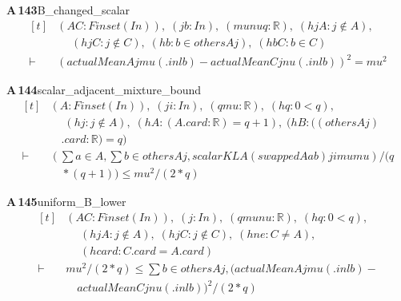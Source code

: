 \documentclass[conference]{IEEEtran}
\theoremstyle{definition}
\newcommand{\lean}[1]{\textsf{\footnotesize #1}}
\begin{document}
\noindent\textbf{A\,143}\quad\lean{B\_changed\_scalar}
{\footnotesize\[ \begin{aligned}[t]
&(\mathit{A} \mathit{C} : \mathit{Finset} (\mathit{I} \mathit{n})),\; (\mathit{j} \mathit{b} : \mathit{I} \mathit{n}),\; (\mathit{mu} \mathit{nu} \mathit{q} : \mathbb{R} ),\; (\mathit{hjA} : \mathit{j} \notin \mathit{A}),\\
&\quad \; (\mathit{hjC} : \mathit{j} \notin \mathit{C}),\; (\mathit{hb} : \mathit{b} \in \mathit{others} \mathit{A} \mathit{j}),\; (\mathit{hbC} : \mathit{b} \in \mathit{C})\\
\vdash\;&(\mathit{actualMean} \mathit{A} \mathit{j} \mathit{mu} (.\mathit{inl} \mathit{b})-\mathit{actualMean} \mathit{C} \mathit{j} \mathit{nu} (.\mathit{inl} \mathit{b}))^{2}=\mathit{mu}^{2}
\end{aligned} \]}

\noindent\textbf{A\,144}\quad\lean{scalar\_adjacent\_mixture\_bound}
{\footnotesize\[ \begin{aligned}[t]
&(\mathit{A} : \mathit{Finset} (\mathit{I} \mathit{n})),\; (\mathit{j} \mathit{i} : \mathit{I} \mathit{n}),\; (\mathit{q} \mathit{mu} : \mathbb{R} ),\; (\mathit{hq} : 0<\mathit{q}),\\
&\quad \; (\mathit{hj} : \mathit{j} \notin \mathit{A}),\; (\mathit{hA} : (\mathit{A}.\mathit{card}:\mathbb{R} )=\mathit{q}+1),\; (\mathit{hB} : ((\mathit{others} \mathit{A} \mathit{j})\\
&\quad .\mathit{card}:\mathbb{R} )=\mathit{q})\\
\vdash\;&(\textstyle\sum \mathit{a} \in \mathit{A},\textstyle\sum \mathit{b} \in \mathit{others} \mathit{A} \mathit{j},\mathit{scalarKL} \mathit{A} (\mathit{swapped} \mathit{A} \mathit{a} \mathit{b}) \mathit{j} \mathit{i} \mathit{mu} \mathit{mu})/(\mathit{q}\\
&\quad *(\mathit{q}+1)) \leq \mathit{mu}^{2}/(2*\mathit{q})
\end{aligned} \]}

\noindent\textbf{A\,145}\quad\lean{uniform\_B\_lower}
{\footnotesize\[ \begin{aligned}[t]
&(\mathit{A} \mathit{C} : \mathit{Finset} (\mathit{I} \mathit{n})),\; (\mathit{j} : \mathit{I} \mathit{n}),\; (\mathit{q} \mathit{mu} \mathit{nu} : \mathbb{R} ),\; (\mathit{hq} : 0<\mathit{q}),\\
&\quad \; (\mathit{hjA} : \mathit{j} \notin \mathit{A}),\; (\mathit{hjC} : \mathit{j} \notin \mathit{C}),\; (\mathit{hne} : \mathit{C} \neq \mathit{A}),\\
&\quad \; (\mathit{hcard} : \mathit{C}.\mathit{card}=\mathit{A}.\mathit{card})\\
\vdash\;&\mathit{mu}^{2}/(2*\mathit{q}) \leq \textstyle\sum \mathit{b} \in \mathit{others} \mathit{A} \mathit{j}, (\mathit{actualMean} \mathit{A} \mathit{j} \mathit{mu} (.\mathit{inl} \mathit{b})-\\
&\quad \mathit{actualMean} \mathit{C} \mathit{j} \mathit{nu} (.\mathit{inl} \mathit{b}))^{2}/(2*\mathit{q})
\end{aligned} \]}
\end{document}
